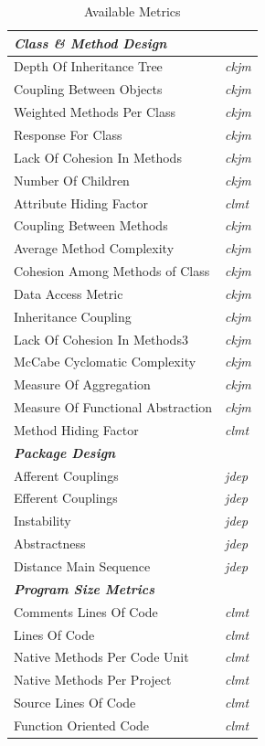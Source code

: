 \documentclass{sig-alternate}
\begin{document}
\begin{table}
\centering
\caption{Available Metrics}
\label{tbl:selected-metrics}
\begin{tabular}{l l}
 \hline
\multicolumn{2}{l}{\textit{\textbf{Class \& Method Design}}}\\
\hline
Depth Of Inheritance Tree & \textit{ckjm}\\
Coupling Between Objects & \textit{ckjm}\\
Weighted Methods Per Class & \textit{ckjm}\\
Response For Class & \textit{ckjm}\\
Lack Of Cohesion In Methods & \textit{ckjm}\\
Number Of Children & \textit{ckjm}\\
Attribute Hiding Factor & \textit{clmt}\\
Coupling Between Methods & \textit{ckjm}\\
Average Method Complexity & \textit{ckjm}\\
Cohesion Among Methods of Class & \textit{ckjm}\\
Data Access Metric & \textit{ckjm}\\
Inheritance Coupling & \textit{ckjm}\\
Lack Of Cohesion In Methods3 & \textit{ckjm}\\
McCabe Cyclomatic Complexity & \textit{ckjm}\\
Measure Of Aggregation & \textit{ckjm}\\
Measure Of Functional Abstraction & \textit{ckjm}\\
Method Hiding Factor & \textit{clmt}\\
\hline
\multicolumn{2}{l}{\textit{\textbf{Package Design}}}\\
\hline
Afferent Couplings & \textit{jdep}\\
Efferent Couplings & \textit{jdep}\\
Instability & \textit{jdep}\\
Abstractness & \textit{jdep}\\
Distance Main Sequence & \textit{jdep}\\
\hline
\multicolumn{2}{l}{\textit{\textbf{Program Size Metrics}}}\\
\hline
Comments Lines Of Code & \textit{clmt}\\
Lines Of Code & \textit{clmt}\\
Native Methods Per Code Unit & \textit{clmt}\\
Native Methods Per Project & \textit{clmt}\\
Source Lines Of Code & \textit{clmt}\\
Function Oriented Code & \textit{clmt}\\
\hline
\end{tabular}
\end{table}
\end{document}
